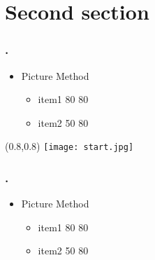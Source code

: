 \documentclass[12pt,t]{beamer}
\begin{document}
\section{Second section}
\begin{frame}
\frametitle{\thesection.~\insertsection}
\begin{itemize}
\item Picture Method
\begin{itemize}
\item item1 80 80 
\item item2 50 80
\end{itemize}
\end{itemize}

\begin{textblock*}{0.45\textwidth}(0.8\textwidth,0.8\textheight)
\texttt{[image: start.jpg]}
\end{textblock*}

\end{frame}




\begin{frame}
\frametitle{\thesection.~\insertsection}
\begin{itemize}
\item Picture Method
\begin{itemize}
\item item1 80 80 
\item item2 50 80
\end{itemize}
\end{itemize}
\end{frame}
\end{document}
